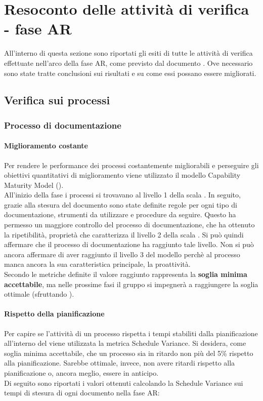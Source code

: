 \documentclass[PianoDiQualifica.tex]{subfiles}
\begin{document}
\section{Resoconto delle attività di verifica - fase AR}
All'interno di questa sezione sono riportati gli esiti di tutte le attività di verifica effettuate nell'arco della fase AR, come previsto dal documento \PPdocRR{}. Ove necessario sono state tratte conclusioni sui risultati e su come essi possano essere migliorati.

\subsection{Verifica sui processi}
	\subsubsection{Processo di documentazione}
		\paragraph{Miglioramento costante}
		Per rendere le performance dei processi costantemente migliorabili e perseguire gli obiettivi quantitativi di miglioramento viene utilizzato il modello Capability Maturity Model ().\\
		All'inizio della fase i processi si trovavano al livello 1 della scala . In seguito, grazie alla stesura del documento \NPdocRR{} sono state definite regole per ogni tipo di documentazione,  strumenti da utilizzare e procedure da seguire. Questo ha permesso un maggiore controllo del processo di documentazione, che ha ottenuto la ripetibilità, proprietà che caratterizza il livello 2 della scala . Si può quindi affermare che il processo di documentazione ha raggiunto tale livello. Non si può ancora affermare di aver raggiunto il livello 3 del modello perchè al processo manca ancora la sua caratteristica principale, la proattività.\\
		Secondo le metriche definite il valore raggiunto rappresenta la \textbf{soglia minima accettabile}, ma nelle prossime fasi il gruppo si impegnerà a raggiungere la soglia ottimale (sfruttando ).

		\paragraph{Rispetto della pianificazione}
			Per capire se l'attività di un processo rispetta i tempi stabiliti dalla pianificazione all'interno del \PPdocRR{} viene utilizzata la metrica Schedule Variance.
			Si desidera, come soglia minima accettabile, che un processo sia in ritardo non più del 5\% rispetto alla pianificazione. Sarebbe ottimale, invece, non avere ritardi rispetto alla pianificazione o, ancora meglio, essere in anticipo.\\
			Di seguito sono riportati i valori ottenuti calcolando la Schedule Variance sui tempi di stesura di ogni documento nella fase AR:\\
			
\end{document}

